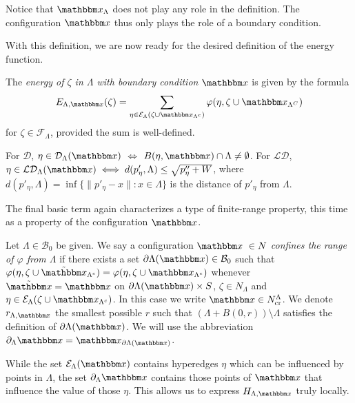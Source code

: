 Notice that $\x_\Lambda$ does not play any role in the definition. The configuration $\x$ thus only plays the role of a boundary condition.

With this definition, we are now ready for the desired definition of the energy function.

\begin{definition}
The \textit{energy of $\zeta$ in $\Lambda$ with boundary condition $\x$} is given by the formula
$$E_{\Lambda,\x}(\zeta) = \sum_{\eta \in \mathcal E_\Lambda(\zeta \cup \x_{\Lambda^c})} \varphi(\eta, \zeta \cup \x_{\Lambda^C})$$
for $\zeta \in \mathcal F_{\Lambda}$, provided the sum is well-defined.
\end{definition}

\begin{remark}
For $\mathcal D$, $\eta \in \mathcal D_\Lambda(\x)$ $\iff$ $B(\eta,\x) \cap \Lambda \neq \emptyset$. \newline
For $\mathcal {LD}$, $\eta \in \mathcal {LD}_\Lambda(\x) \iff d(p'_\eta,\Lambda) \leq \sqrt{p''_\eta + W}$, where $d(p'_\eta,\Lambda) = \inf\{\|p'_\eta - x\|: x \in \Lambda\}$ is the distance of $p'_\eta$ from $\Lambda$.    \newline
\end{remark}

The final basic term again characterizes a type of finite-range property, this time as a property of the configuration $\x$.

\begin{definition}
	Let $\Lambda \in \mathcal B_0$ be given. We say a configuration $\x\ \in N$ \textit{confines the range of $\varphi$ from $\Lambda$} if there exists a set $\partial \Lambda(\x) \in \mathcal B_0$ such that $\varphi(\eta,\zeta \cup \tilde{\x}_{\Lambda^c}) = \varphi(\eta,\zeta\cup\x_{\Lambda^c})$ whenever $\tilde{\x} = \x$ on $\partial \Lambda(\x)\times S$, $\zeta \in N_\Lambda$ and $\eta \in \mathcal E_\Lambda(\zeta\cup\x_{\Lambda^c})$. In this case we write $\x \in N^\Lambda_\text{cr}$. We denote $r_{\Lambda,\x}$ the smallest possible $r$ such that $(\Lambda + B(0,r))\setminus \Lambda$ satisfies the definition of $\partial \Lambda(\x)$. We will use the abbreviation $\partial_\Lambda \x = \x_{\partial \Lambda(\x)}$.
\end{definition}

While the set $\mathcal E_\Lambda(\x)$ contains hyperedges $\eta$ which can be influenced by points in $\Lambda$, the set $\partial_\Lambda \x$  contains those points of $\x$ that influence the value of those $\eta$. This allows us to express $H_{\Lambda,\x}$ truly locally.

